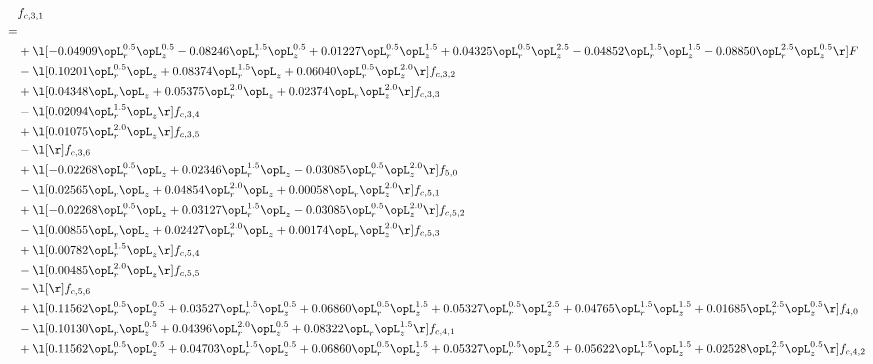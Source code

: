 \begin{alignat}{2} 
\label{eq:f_31_2} 
& f_{c,3,1} \nonumber \\ 
 = \\ 
& + \l[  -0.04909 \opL_r^{0.5} \opL_z^{0.5}   -0.08246 \opL_r^{1.5} \opL_z^{0.5} +  0.01227 \opL_r^{0.5} \opL_z^{1.5} +  0.04325 \opL_r^{0.5} \opL_z^{2.5}   -0.04852 \opL_r^{1.5} \opL_z^{1.5}   -0.08850 \opL_r^{2.5} \opL_z^{0.5}  \r] F \nonumber \\ 
& - \l[  0.10201 \opL_r^{0.5} \opL_z +  0.08374 \opL_r^{1.5} \opL_z +  0.06040 \opL_r^{0.5} \opL_z^{2.0}  \r] f_{c,3,2} \nonumber \\ 
& + \l[  0.04348 \opL_r \opL_z +  0.05375 \opL_r^{2.0} \opL_z +  0.02374 \opL_r \opL_z^{2.0}  \r] f_{c,3,3} \nonumber \\ 
& - \l[  0.02094 \opL_r^{1.5} \opL_z  \r] f_{c,3,4} \nonumber \\ 
& + \l[  0.01075 \opL_r^{2.0} \opL_z  \r] f_{c,3,5} \nonumber \\ 
& - \l[  \r] f_{c,3,6} \nonumber \\ 
& + \l[  -0.02268 \opL_r^{0.5} \opL_z +  0.02346 \opL_r^{1.5} \opL_z   -0.03085 \opL_r^{0.5} \opL_z^{2.0}  \r] f_{5,0} \nonumber \\ 
& - \l[  0.02565 \opL_r \opL_z +  0.04854 \opL_r^{2.0} \opL_z +  0.00058 \opL_r \opL_z^{2.0}  \r] f_{c,5,1} \nonumber \\ 
& + \l[  -0.02268 \opL_r^{0.5} \opL_z +  0.03127 \opL_r^{1.5} \opL_z   -0.03085 \opL_r^{0.5} \opL_z^{2.0}  \r] f_{c,5,2} \nonumber \\ 
& - \l[  0.00855 \opL_r \opL_z +  0.02427 \opL_r^{2.0} \opL_z +  0.00174 \opL_r \opL_z^{2.0}  \r] f_{c,5,3} \nonumber \\ 
& + \l[  0.00782 \opL_r^{1.5} \opL_z  \r] f_{c,5,4} \nonumber \\ 
& - \l[  0.00485 \opL_r^{2.0} \opL_z  \r] f_{c,5,5} \nonumber \\ 
& - \l[  \r] f_{c,5,6} \nonumber \\ 
& + \l[  0.11562 \opL_r^{0.5} \opL_z^{0.5} +  0.03527 \opL_r^{1.5} \opL_z^{0.5} +  0.06860 \opL_r^{0.5} \opL_z^{1.5} +  0.05327 \opL_r^{0.5} \opL_z^{2.5} +  0.04765 \opL_r^{1.5} \opL_z^{1.5} +  0.01685 \opL_r^{2.5} \opL_z^{0.5}  \r] f_{4,0} \nonumber \\ 
& - \l[  0.10130 \opL_r \opL_z^{0.5} +  0.04396 \opL_r^{2.0} \opL_z^{0.5} +  0.08322 \opL_r \opL_z^{1.5}  \r] f_{c,4,1} \nonumber \\ 
& + \l[  0.11562 \opL_r^{0.5} \opL_z^{0.5} +  0.04703 \opL_r^{1.5} \opL_z^{0.5} +  0.06860 \opL_r^{0.5} \opL_z^{1.5} +  0.05327 \opL_r^{0.5} \opL_z^{2.5} +  0.05622 \opL_r^{1.5} \opL_z^{1.5} +  0.02528 \opL_r^{2.5} \opL_z^{0.5}  \r] f_{c,4,2} \nonumber \\ 

\end{alignat}
